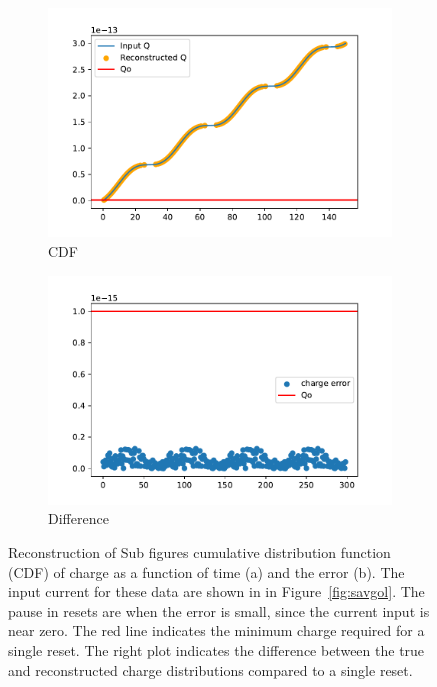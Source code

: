 \begin{figure}[]
\centering
\begin{subfigure}{.5\textwidth}
  \centering
  \includegraphics[width=\textwidth]{images/reconQ.pdf}
  \caption{CDF}
\end{subfigure}%
\begin{subfigure}{.5\textwidth}
  \centering
  \includegraphics[width=\textwidth]{images/diffQ.pdf}
  \caption{Difference}
\end{subfigure}
\caption{Reconstruction of Sub figures cumulative distribution function (CDF) of charge as a function of time (a) and the error (b).
The input current for these data are shown in in Figure~\ref{fig:savgol}.
The pause in resets are when the error is small, since the current input is near zero.
The red line indicates the minimum charge required for a single reset.
The right plot indicates the difference between the true and reconstructed charge distributions compared to a single reset.
}
\label{fig:reconQ}
\end{figure}

